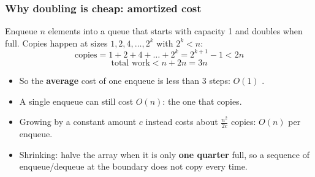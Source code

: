 \documentclass[aspectratio=169,10pt,compress]{beamer}
\begin{document}
\begin{frame}[t,fragile] \frametitle{Why doubling is cheap: amortized cost}
  Enqueue $n$ elements into a queue that starts with capacity 1 and doubles when full.
  Copies happen at sizes $1, 2, 4, \dots, 2^{k}$ with $2^{k} < n$:
  \[
  	\text{copies} = 1 + 2 + 4 + \dots + 2^{k} = 2^{k+1} - 1 < 2n
  \]
  \[
  	\text{total work} < n + 2n = 3n
  \]
  \vspace{0.2em}
  \begin{itemize}
    \item So the \textbf{average} cost of one enqueue is less than 3 steps: $O(1)$ .
    \item A single enqueue can still cost $O(n)$: the one that copies.
    \item Growing by a constant amount $c$ instead costs about $\frac{n^{2}}{2c}$ copies: $O(n)$ per enqueue.
    \item Shrinking: halve the array when it is only \textbf{one quarter} full, so a sequence of enqueue/dequeue at the boundary does not copy every time.
  \end{itemize}
\end{frame}

\end{document}

